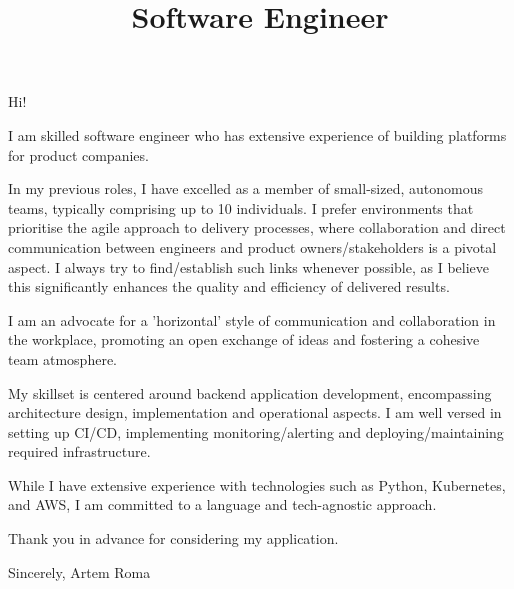 \documentclass[11pt,a4paper,sans]{moderncv}
\title{Software Engineer}
\begin{document}
Hi!

I am skilled software engineer who has extensive experience of building platforms for product companies.

In my previous roles, I have excelled as a member of small-sized, autonomous teams, typically comprising up to 10 individuals. 
I prefer environments that prioritise the agile approach to delivery processes, 
where collaboration and direct communication between engineers and product owners/stakeholders is a pivotal aspect. 
I always try to find/establish such links whenever possible, as I believe this significantly enhances the quality and efficiency of delivered results.

I am an advocate for a 'horizontal' style of communication and collaboration in the workplace, promoting an open exchange of ideas and fostering a cohesive team atmosphere. 

My skillset  is centered around backend application development, encompassing architecture design, implementation and operational aspects. 
I am well versed in setting up CI/CD, implementing monitoring/alerting and deploying/maintaining required infrastructure.

While I have extensive experience with technologies such as Python, Kubernetes, and AWS, I am committed to a language and tech-agnostic approach. 

Thank you in advance for considering my application.

Sincerely,
Artem Roma
\end{document}
